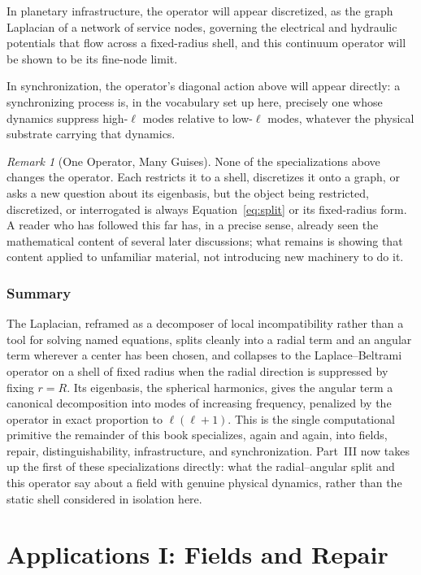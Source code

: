 \documentclass[11pt,fleqn]{book}
\numberwithin{equation}{chapter}
\theoremstyle{plain}
\theoremstyle{definition}
\theoremstyle{remark}
\newtheorem{remark}[theorem]{Remark}
\begin{document}
In planetary infrastructure, the operator will appear discretized, as the graph Laplacian of a network of service nodes, governing the electrical and hydraulic potentials that flow across a fixed-radius shell, and this continuum operator will be shown to be its fine-node limit.

In synchronization, the operator's diagonal action above will appear directly: a synchronizing process is, in the vocabulary set up here, precisely one whose dynamics suppress high-\(\ell\) modes relative to low-\(\ell\) modes, whatever the physical substrate carrying that dynamics.

\begin{remark}[One Operator, Many Guises]
None of the specializations above changes the operator. Each restricts it to a shell, discretizes it onto a graph, or asks a new question about its eigenbasis, but the object being restricted, discretized, or interrogated is always Equation~\eqref{eq:split} or its fixed-radius form. A reader who has followed this far has, in a precise sense, already seen the mathematical content of several later discussions; what remains is showing that content applied to unfamiliar material, not introducing new machinery to do it.
\end{remark}

\section{Summary}

The Laplacian, reframed as a decomposer of local incompatibility rather than a tool for solving named equations, splits cleanly into a radial term and an angular term wherever a center has been chosen, and collapses to the Laplace--Beltrami operator on a shell of fixed radius when the radial direction is suppressed by fixing \(r=R\). Its eigenbasis, the spherical harmonics, gives the angular term a canonical decomposition into modes of increasing frequency, penalized by the operator in exact proportion to \(\ell(\ell+1)\). This is the single computational primitive the remainder of this book specializes, again and again, into fields, repair, distinguishability, infrastructure, and synchronization. Part~III now takes up the first of these specializations directly: what the radial--angular split and this operator say about a field with genuine physical dynamics, rather than the static shell considered in isolation here.


\part{Applications I: Fields and Repair}
\end{document}
